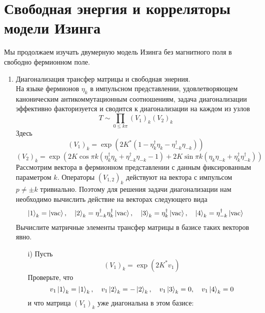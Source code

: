 \documentclass[12pt]{article}
\theoremstyle{definition}
\begin{document}
\section{Свободная энергия и корреляторы модели Изинга}
Мы продолжаем изучать двумерную модель Изинга без магнитного поля в свободно фермионном поле.
\begin{enumerate}
    \item Диагонализация трансфер матрицы и свободная энерния.\\
    На языке фермионов $\eta_k$ в импульсном представлении, удовлетворяющем каноническим антикоммутационным соотношениям, задача диагонализации эффективно факторизуется и сводится к диагонализации на каждом из узлов
    \begin{equation}
        T\sim\prod_{0\leq k\pi}(V_1)_k(V_2)_k
    \end{equation}
    Здесь
    \begin{equation}
        (V_1)_k=\exp(2K^*(1-\eta^\dagger_k\eta_k-\eta^\dagger_{-k}\eta_{-k}))
    \end{equation}
    \begin{equation}
        (V_2)_k=\exp(2K\cos\pi k(\eta^\dagger_k\eta_k+\eta^\dagger_{-k}\eta_{-k}-1)+2K\sin\pi k(\eta_k\eta_{-k}+\eta_k^\dagger\eta_{-k}^\dagger))
    \end{equation}
    Рассмотрим вектора в фермионном представлении с данным фиксированным параметром $k$. Операторы $(V_{1,2})_k$ действуют на вектора с импульсом $p\neq\pm k$ тривиально. Поэтому для решения задачи диагонализации нам необходимо вычислить действие на векторах следующего вида
    \begin{equation}
        \ket{1}_k=\ket{\text{vac}},\quad\ket{2}_k=\eta^\dagger_{-k}\eta^\dagger_k\ket{\text{vac}},\quad\ket{3}_k=\eta_k^\dagger\ket{\text{vac}},\quad\ket{4}_k=\eta^\dagger_{-k}\ket{\text{vac}}
    \end{equation}
    Вычислите матричные элементы трансфер матрицы в базисе таких векторов явно.
    \begin{itemize}
        \item[i)] Пусть
        \begin{equation}
            (V_1)_k=\exp(2K^*v_1)
        \end{equation}
        Проверьте, что
        \begin{equation}
            v_1\ket{1}_k=\ket{1}_k,\quad v_1\ket{2}_k=-\ket{2}_k,\quad v_1\ket{3}_k=0,\quad v_1\ket{4}_k=0
        \end{equation}
        и что матрица $(V_1)_k$ уже диагональна в этом базисе:

\end{itemize}
\end{enumerate}
\end{document}
